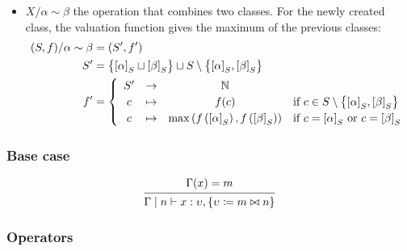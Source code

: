 \documentclass{article}
\begin{document}
\begin{itemize}
  \item $X/\alpha \sim \beta$ the operation that combines two
        classes. For the newly created class, the valuation function gives
        the maximum of the previous classes:
        \begin{align*}
          (S, f)/\alpha \sim \beta
             & = (S', f')                                           \\
          S' & =\bigl\{ {[\alpha]}_{S} \sqcup {[\beta]}_{S} \bigr\}
          \sqcup
          S\setminus \bigl\{{[\alpha]}_{S}, {[\beta]}_{S}\bigr\}
          \\
          f' & = \left\{
          \def\arraystretch{1.2}
          \begin{array}{cccl}
            S' & \to
               & \mathbb{N}
            \\
            c  & \mapsto
               & f(c)
               & \text{if } c \in S\setminus \bigl\{{[\alpha]}_{S}, {[\beta]}_{S}\bigr\}
            \\
            c  & \mapsto
               & \max\left(f\left({[\alpha]}_{S}\right), f\left({[\beta]}_{S}\right)\right)
               & \text{if } c = {[\alpha]}_{S} \text{ or } c = {[\beta]}_{S}
          \end{array}
          \right.
        \end{align*}

\end{itemize}

\subsubsection*{Base case}

\begin{equation*}
  \begin{prooftree}
    \hypo{\Gamma(x) = m} \infer1{\Gamma \mid n \vdash x: \upsilon,
      \left\{\upsilon \coloneq m \bowtie n\right\}}
  \end{prooftree}
\end{equation*}

\subsubsection*{Operators}
\end{document}
